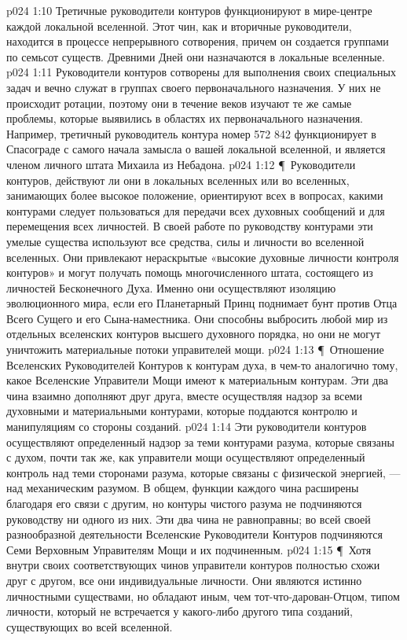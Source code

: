 \vs p024 1:10 Третичные руководители контуров функционируют в мире\hyp{}центре каждой локальной вселенной. Этот чин, как и вторичные руководители, находится в процессе непрерывного сотворения, причем он создается группами по семьсот существ. Древними Дней они назначаются в локальные вселенные.
\vs p024 1:11 Руководители контуров сотворены для выполнения своих специальных задач и вечно служат в группах своего первоначального назначения. У них не происходит ротации, поэтому они в течение веков изучают те же самые проблемы, которые выявились в областях их первоначального назначения. Например, третичный руководитель контура номер 572 842 функционирует в Спасограде с самого начала замысла о вашей локальной вселенной, и является членом личного штата Михаила из Небадона.
\vs p024 1:12 \P\ Руководители контуров, действуют ли они в локальных вселенных или во вселенных, занимающих более высокое положение, ориентируют всех в вопросах, какими контурами следует пользоваться для передачи всех духовных сообщений и для перемещения всех личностей. В своей работе по руководству контурами эти умелые существа используют все средства, силы и личности во вселенной вселенных. Они привлекают нераскрытые «высокие духовные личности контроля контуров» и могут получать помощь многочисленного штата, состоящего из личностей Бесконечного Духа. Именно они осуществляют изоляцию эволюционного мира, если его Планетарный Принц поднимает бунт против Отца Всего Сущего и его Сына\hyp{}наместника. Они способны выбросить любой мир из отдельных вселенских контуров высшего духовного порядка, но они не могут уничтожить материальные потоки управителей мощи.
\vs p024 1:13 \P\ Отношение Вселенских Руководителей Контуров к контурам духа, в чем\hyp{}то аналогично тому, какое Вселенские Управители Мощи имеют к материальным контурам. Эти два чина взаимно дополняют друг друга, вместе осуществляя надзор за всеми духовными и материальными контурами, которые поддаются контролю и манипуляциям со стороны созданий.
\vs p024 1:14 Эти руководители контуров осуществляют определенный надзор за теми контурами разума, которые связаны с духом, почти так же, как управители мощи осуществляют определенный контроль над теми сторонами разума, которые связаны с физической энергией, --- над механическим разумом. В общем, функции каждого чина расширены благодаря его связи с другим, но контуры чистого разума не подчиняются руководству ни одного из них. Эти два чина не равноправны; во всей своей разнообразной деятельности Вселенские Руководители Контуров подчиняются Семи Верховным Управителям Мощи и их подчиненным.
\vs p024 1:15 \P\ Хотя внутри своих соответствующих чинов управители контуров полностью схожи друг с другом, все они индивидуальные личности. Они являются истинно личностными существами, но обладают иным, чем тот\hyp{}что\hyp{}дарован\hyp{}Отцом, типом личности, который не встречается у какого\hyp{}либо другого типа созданий, существующих во всей вселенной.

